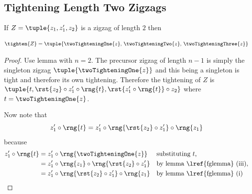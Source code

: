 \subsection{Tightening Length Two Zigzags}
{%

\begin{lemma}
If $Z=\tuple{z_1,z'_1,z_2}$ is a zigzag of length $2$
then

\[
\tighten{Z}=\tuple{ \twoTighteningOne{z},
                     \,\twoTighteningTwo{z},
                     \,\twoTighteningThree{z}}
\]
\end{lemma}
\begin{proof}
\newcommand {\longTighteningTwo}{\rst{z_2} \circ z'_1 \circ \rng{t}}
\newcommand {\longTighteningThree}{\rst{z'_1 \circ \rng{t}} \circ z_2}
Use lemma  with $n=2$. The precursor zigzag of length $n-1$ is simply the singleton zigzag \nudgeup{0.55cm}$\tuple{\twoTighteningOne{z}}$ and this being a  singleton is tight and therefore its own tightening. Therefore the tightening of $Z$ is 
\nudgeup{0.55cm}$\tuple{t, \longTighteningTwo,\longTighteningThree}$
where $t = \twoTighteningOne{z}$. 

Now note that 
\begin{equation}
\label{tighteningTwoIntermediate}
z'_1 \circ \rng{t} = z'_1 \circ \rng{\rst{z_2} \circ z'_1} \circ \rng{z_1}
\end{equation}  
because
\begin{align*}
z'_1 \circ \rng{t} 
     &= z'_1 \circ \rng{\twoTighteningOne{z}} 
     && \mbox{substituting $t$,}\\
     &= z'_1 \circ \rng{z_1} \circ \rng{\rst{z_2} \circ z'_1} 
     && \mbox{by lemma \lref{fglemma} (iii),}\\
     &= z'_1 \circ \rng{\rst{z_2} \circ z'_1}  \circ \rng{z_1}
     && \mbox{by lemma \lref{fglemma} (i)}
\end{align*}


\end{proof}}
